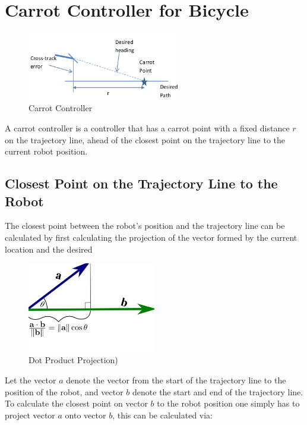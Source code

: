 \documentclass{article}
\begin{document}
\newpage
\section{Carrot Controller for Bicycle}

\begin{figure}[H]
	\centering
	\includegraphics[width=0.6\textwidth]{images/carrot_controller.png}
	\caption{Carrot Controller}
	\label{fig:carrot_controller}
\end{figure}

A carrot controller is a controller that has a carrot point with a fixed distance $r$ on the trajectory line, ahead of the closest point on the trajectory line to the current robot position.


\subsection{Closest Point on the Trajectory Line to the Robot}
The closest point between the robot's position and the trajectory line can be calculated by first calculating the projection of the vector formed by the current location and the desired 

\begin{figure}[H]
	\centering
	\includegraphics[width=0.5\textwidth]{images/dot_product_projection.png}
	\caption{Dot Product Projection)}
	\label{fig:dot_product_projection}
\end{figure}

Let the vector $a$ denote the vector from the start of the trajectory line to the position of the robot, and vector $b$ denote the start and end of the trajectory line. To calculate the closest point on vector $b$ to the robot position one simply has to project vector $a$ onto vector $b$, this can be calculated via:
\end{document}
